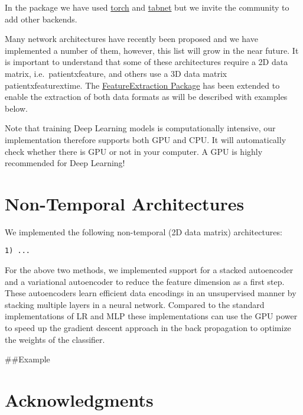 \documentclass[
]{article}
\begin{document}
In the package we have used
\href{https://cran.r-project.org/web/packages/torch/index.html}{torch}
and
\href{https://cran.r-project.org/web/packages/tabnet/index.html}{tabnet}
but we invite the community to add other backends.

Many network architectures have recently been proposed and we have
implemented a number of them, however, this list will grow in the near
future. It is important to understand that some of these architectures
require a 2D data matrix,
i.e.~\textbar patient\textbar x\textbar feature\textbar, and others use
a 3D data matrix
\textbar patient\textbar x\textbar feature\textbar x\textbar time\textbar.
The \href{www.github.com/ohdsi/FeatureExtraction}{FeatureExtraction
Package} has been extended to enable the extraction of both data formats
as will be described with examples below.

Note that training Deep Learning models is computationally intensive,
our implementation therefore supports both GPU and CPU. It will
automatically check whether there is GPU or not in your computer. A GPU
is highly recommended for Deep Learning!

\hypertarget{non-temporal-architectures}{%
\section{Non-Temporal Architectures}\label{non-temporal-architectures}}

We implemented the following non-temporal (2D data matrix)
architectures:

\begin{verbatim}
1) ...
\end{verbatim}

For the above two methods, we implemented support for a stacked
autoencoder and a variational autoencoder to reduce the feature
dimension as a first step. These autoencoders learn efficient data
encodings in an unsupervised manner by stacking multiple layers in a
neural network. Compared to the standard implementations of LR and MLP
these implementations can use the GPU power to speed up the gradient
descent approach in the back propagation to optimize the weights of the
classifier.

\#\#Example

\hypertarget{acknowledgments}{%
\section{Acknowledgments}\label{acknowledgments}}
\end{document}

